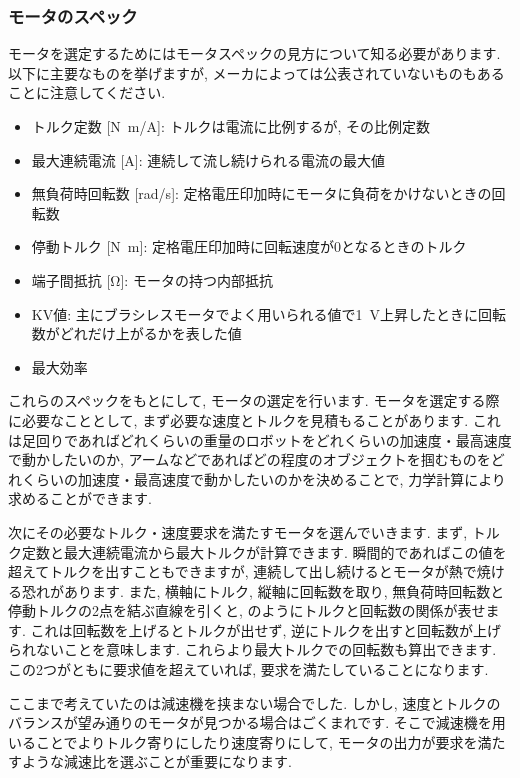 \subsubsection{モータのスペック}
モータを選定するためにはモータスペックの見方について知る必要があります. 
以下に主要なものを挙げますが, メーカによっては公表されていないものもあることに注意してください. 
\begin{itemize}
    \item トルク定数 [\si{\newton\metre/\ampere}]: トルクは電流に比例するが, その比例定数
    \item 最大連続電流 [\si{\ampere}]: 連続して流し続けられる電流の最大値
    \item 無負荷時回転数 [\si{\radian/\second}]: 定格電圧印加時にモータに負荷をかけないときの回転数
    \item 停動トルク [\si{\newton\metre}]: 定格電圧印加時に回転速度が0となるときのトルク
    \item 端子間抵抗 [\si{\ohm}]: モータの持つ内部抵抗
    \item KV値: 主にブラシレスモータでよく用いられる値で\SI{1}{\volt}上昇したときに回転数がどれだけ上がるかを表した値
    \item 最大効率
\end{itemize}
\par
これらのスペックをもとにして, モータの選定を行います. 
モータを選定する際に必要なこととして, まず必要な速度とトルクを見積もることがあります. 
これは足回りであればどれくらいの重量のロボットをどれくらいの加速度・最高速度で動かしたいのか, アームなどであればどの程度のオブジェクトを掴むものをどれくらいの加速度・最高速度で動かしたいのかを決めることで, 力学計算により求めることができます. 
\par
次にその必要なトルク・速度要求を満たすモータを選んでいきます. 
まず, トルク定数と最大連続電流から最大トルクが計算できます. 
瞬間的であればこの値を超えてトルクを出すこともできますが, 連続して出し続けるとモータが熱で焼ける恐れがあります. 
また, 横軸にトルク, 縦軸に回転数を取り, 無負荷時回転数と停動トルクの2点を結ぶ直線を引くと, のようにトルクと回転数の関係が表せます. 
これは回転数を上げるとトルクが出せず, 逆にトルクを出すと回転数が上げられないことを意味します. 
これらより最大トルクでの回転数も算出できます. 
この2つがともに要求値を超えていれば, 要求を満たしていることになります. 
\par
ここまで考えていたのは減速機を挟まない場合でした. 
しかし, 速度とトルクのバランスが望み通りのモータが見つかる場合はごくまれです. 
そこで減速機を用いることでよりトルク寄りにしたり速度寄りにして, モータの出力が要求を満たすような減速比を選ぶことが重要になります. 
